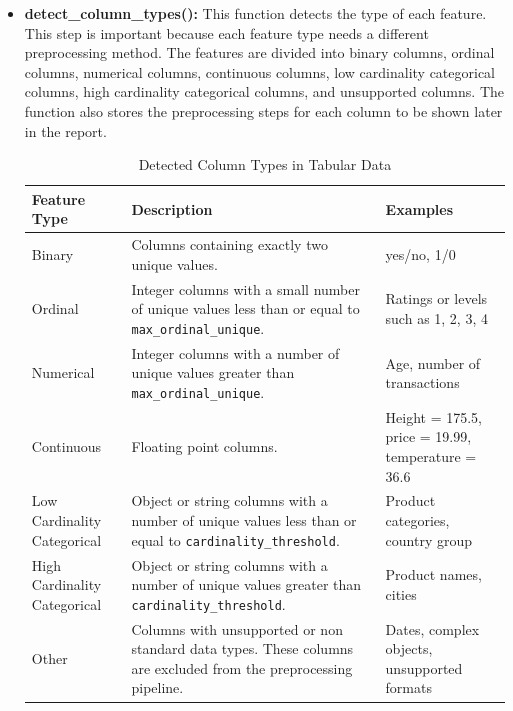 \documentclass[12pt,a4paper]{report}
\newcommand{\acceleraTableStyle}{%
\small
\renewcommand{\arraystretch}{1.15}
\setlength{\tabcolsep}{4pt}%
}
\begin{document}
\begin{itemize}
    \item \textbf{detect\_column\_types():}
    This function detects the type of each feature. This step is important because each
    feature type needs a different preprocessing method. The features are divided into
    binary columns, ordinal columns, numerical columns, continuous columns,
    low cardinality categorical columns, high cardinality categorical columns, and
    unsupported columns. The function also stores the preprocessing steps for each
    column to be shown later in the report.
    \begin{table}[!htbp]
    \centering
\acceleraTableStyle
    \caption{Detected Column Types in Tabular Data}
    \label{tab:feature_types}
    \renewcommand{\arraystretch}{1.15}
    \begin{tabularx}{\textwidth}{p{}X p{}}
    \hline

    \textbf{Feature Type} & \textbf{Description} & \textbf{Examples} \\
    \midrule

    Binary &
    Columns containing exactly two unique values. &
    yes/no, 1/0 \\
    \midrule

    Ordinal &
    Integer columns with a small number of unique values less than or equal to
    \texttt{max\_ordinal\_unique}. &
    Ratings or levels such as 1, 2, 3, 4 \\
    \midrule

    Numerical &
    Integer columns with a number of unique values greater than
    \texttt{max\_ordinal\_unique}. &
    Age, number of transactions \\
    \midrule

    Continuous &
    Floating point columns. &
    Height = 175.5, price = 19.99, temperature = 36.6 \\
    \midrule

    Low Cardinality Categorical &
    Object or string columns with a number of unique values less than or equal to
    \texttt{cardinality\_threshold}. &
    Product categories, country group \\
    \midrule

    High Cardinality Categorical &
    Object or string columns with a number of unique values greater than
    \texttt{cardinality\_threshold}. &
    Product names, cities \\
    \midrule

    Other &
    Columns with unsupported or non standard data types. These columns are excluded from
    the preprocessing pipeline. &
    Dates, complex objects, unsupported formats \\
    \bottomrule


\end{tabularx}
\end{table}
\end{itemize}
\end{document}
